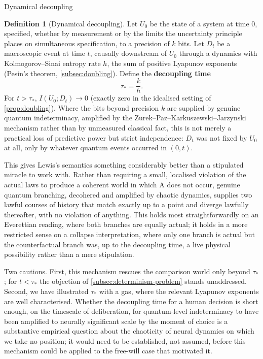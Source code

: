 \documentclass[11pt]{article}
\theoremstyle{definition}
\newtheorem{definition}{Definition}[section]
\begin{document}
\begin{techbox}{Dynamical decoupling}
\begin{definition}[Dynamical decoupling]
\label{def:decoupling}
Let $U_0$ be the state of a system at time $0$, specified, whether by measurement or by the limits the uncertainty principle places on simultaneous specification, to a precision of $k$ bits. Let $D_t$ be a macroscopic event at time $t$, causally downstream of $U_0$ through a dynamics with Kolmogorov--Sinai entropy rate $h$, the sum of positive Lyapunov exponents (Pesin's theorem, \cref{subsec:doubling}). Define the \textbf{decoupling time}
\[
\tau_* = \frac{k}{h}.
\]
For $t > \tau_*$, $I(U_0; D_t) \to 0$ (exactly zero in the idealised setting of \cref{prop:doubling}). Where the bits beyond precision $k$ are supplied by genuine quantum indeterminacy, amplified by the Zurek--Paz--Karkuszewski--Jarzynski mechanism rather than by unmeasured classical fact, this is not merely a practical loss of predictive power but strict independence: $D_t$ was not fixed by $U_0$ at all, only by whatever quantum events occurred in $(0,t)$.
\end{definition}
\end{techbox}

This gives Lewis's semantics something considerably better than a stipulated miracle to work with. Rather than requiring a small, localised violation of the actual laws to produce a coherent world in which A does not occur, genuine quantum branching, decohered and amplified by chaotic dynamics, supplies two lawful courses of history that match exactly up to a point and diverge lawfully thereafter, with no violation of anything. This holds most straightforwardly on an Everettian reading, where both branches are equally actual; it holds in a more restricted sense on a collapse interpretation, where only one branch is actual but the counterfactual branch was, up to the decoupling time, a live physical possibility rather than a mere stipulation.

Two cautions. First, this mechanism rescues the comparison world only beyond $\tau_*$; for $t < \tau_*$ the objection of \cref{subsec:determinism-problem} stands unaddressed. Second, we have illustrated $\tau_*$ with a gas, where the relevant Lyapunov exponents are well characterised. Whether the decoupling time for a human decision is short enough, on the timescale of deliberation, for quantum-level indeterminacy to have been amplified to neurally significant scale by the moment of choice is a substantive empirical question about the chaoticity of neural dynamics on which we take no position; it would need to be established, not assumed, before this mechanism could be applied to the free-will case that motivated it.
\end{document}
